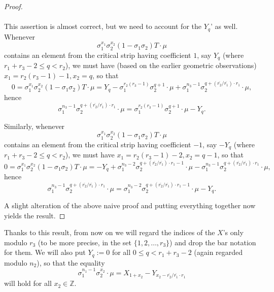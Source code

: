 \documentclass[12pt,a4paper]{article}
\theoremstyle{definition}
\newcommand{\Z}{\mathbb{Z}}
\newcommand{\uo}{\overline{r_2}}
\newcommand{\vo}{\overline{r_1}}
\begin{document}
\begin{proof}
\paragraph*{}
This assertion is almost correct, but we need to account for the $Y_q$' as well. Whenever $$\sigma_1^{x_1}\sigma_2^{x_2}(1-\sigma_1\sigma_2)T\cdot \mu$$ contains an element from the critical strip having coefficient $1$, say $Y_q$ (where $r_1+r_3-2\leq q<r_2$), we must have (based on the earlier geometric observations) $x_1=r_2(r_3-1)-1, x_2=q$, so that 
$$0=\sigma_1^{x_1}\sigma_2^{x_2}(1-\sigma_1\sigma_2)T\cdot \mu=Y_q-\sigma_1^{r_2(r_3-1)}\sigma_2^{q+1}\cdot \mu+\sigma_1^{n_3-1}\sigma_2^{q+(\uo/\vo)\cdot r_1}\cdot \mu,$$
hence $$\sigma_1^{n_3-1}\sigma_2^{q+(\uo/\vo)\cdot r_1}\cdot \mu=\sigma_1^{r_2(r_3-1)}\sigma_2^{q+1}\cdot \mu- Y_q.$$

Similarly, whenever $$\sigma_1^{x_1}\sigma_2^{x_2}(1-\sigma_1\sigma_2)T\cdot \mu$$ contains an element from the critical strip having coefficient $-1$, say $-Y_q$ (where $r_1+r_3-2\leq q<r_2$), we must have $x_1=r_2(r_3-1)-2, x_2=q-1$, so that 
$$0=\sigma_1^{x_1}\sigma_2^{x_2}(1-\sigma_1\sigma_2)T\cdot \mu=-Y_q+\sigma_1^{n_3-2}\sigma_2^{q+(\uo/\vo)\cdot r_1-1}\cdot \mu-\sigma_1^{n_3-1}\sigma_2^{q+(\uo/\vo)\cdot r_1}\cdot \mu,$$
hence $$\sigma_1^{n_3-1}\sigma_2^{q+(\uo/\vo)\cdot r_1}\cdot \mu=\sigma_1^{n_3-2}\sigma_2^{q+(\uo/\vo)\cdot r_1-1}\cdot \mu- Y_q.$$

A slight alteration of the above naive proof and putting everything together now yields the result.
\end{proof}
Thanks to this result, from now on we will regard the indices of the $X$'s only modulo $r_3$ (to be more precise, in the set $\{1,2,\dots,r_3\}$) and drop the bar notation for them. We will also put $Y_q:=0$ for all $0\leq q<r_1+r_3-2$ (again regarded modulo $n_2$), so that the equality $$\sigma_1^{n_1-1}\sigma_2^{x_2}\cdot \mu=X_{1+x_2}-Y_{x_2-\uo/\vo\cdot r_1} $$ will hold for all $x_2\in\Z$.
\end{document}
